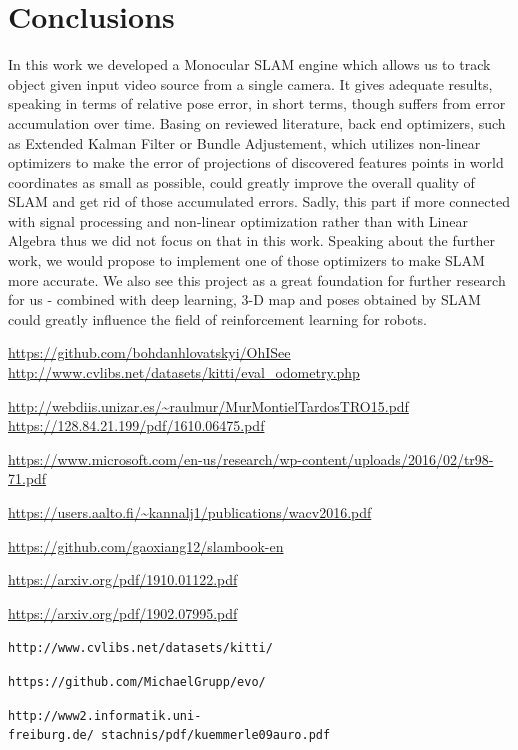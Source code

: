 \section{Conclusions}
In this work we developed a Monocular SLAM engine which allows us to track object given input video source from a single camera. It gives adequate results, speaking in terms of relative pose error, in short terms, though suffers from error accumulation over time. Basing on reviewed literature, back end optimizers, such as Extended Kalman Filter or Bundle Adjustement, which utilizes non-linear optimizers to make the error of projections of discovered features points in world coordinates as small as possible, could greatly improve the overall quality of SLAM and get rid of those accumulated errors. Sadly, this part if more connected with signal processing and non-linear optimization rather than with Linear Algebra thus we did not focus on that in this work. Speaking about the further work, we would propose to implement one of those optimizers to make SLAM more accurate. We also see this project as a great foundation for further research for us - combined with deep learning, 3-D map and poses obtained by SLAM could greatly influence the field of reinforcement learning for robots. 


\pagebreak
\appendix
\begin{thebibliography}{10}

 \url{https://github.com/bohdanhlovatskyi/OhISee}
 \url{http://www.cvlibs.net/datasets/kitti/eval_odometry.php}

 \url{http://webdiis.unizar.es/~raulmur/MurMontielTardosTRO15.pdf}
 \url{https://128.84.21.199/pdf/1610.06475.pdf}

 \url{https://www.microsoft.com/en-us/research/wp-content/uploads/2016/02/tr98-71.pdf} 

 \url{https://users.aalto.fi/~kannalj1/publications/wacv2016.pdf}

 \url{https://github.com/gaoxiang12/slambook-en}

 \url{https://arxiv.org/pdf/1910.01122.pdf}

 \url{https://arxiv.org/pdf/1902.07995.pdf}

\texttt{http://www.cvlibs.net/datasets/kitti/}

\texttt{https://github.com/MichaelGrupp/evo/}

\texttt{http://www2.informatik.uni-freiburg.de/~stachnis/pdf/kuemmerle09auro.pdf}

\end{thebibliography}



